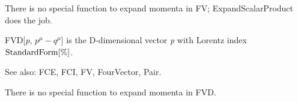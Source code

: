 \dispSFoutmath{
\mu 
}







There is no special function to expand momenta in FV; ExpandScalarProduct does the job.







FVD[{\itshape p}, \({p^{\mu }}-{q^{\mu }}\)] is the D-dimensional vector {\itshape p} with Lorentz index \(\mathrm{StandardForm}[\%]\).

See also:  FCE, FCI, FV, FourVector, Pair.



\dispSFoutmath{
\mu 
}

\dispSFinmath{
\mu 
}






There is no special function to expand momenta in FVD.


